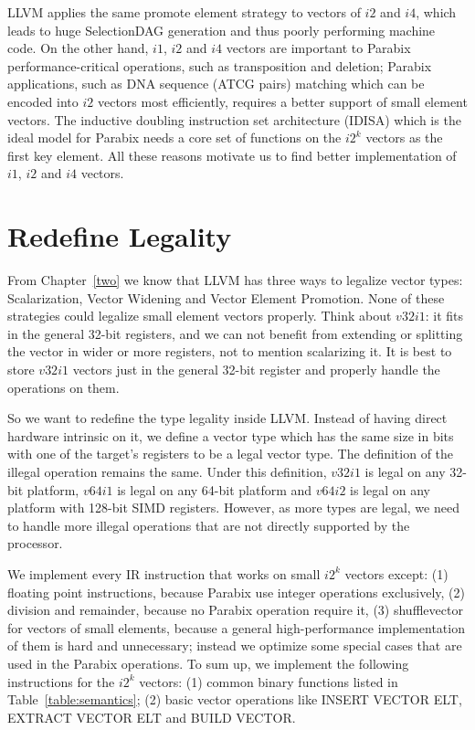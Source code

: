 LLVM applies the same promote element strategy to vectors of $i2$ and $i4$, which leads to huge SelectionDAG generation and thus poorly performing machine code. On the other hand, $i1$, $i2$ and $i4$ vectors are important to Parabix performance-critical operations, such as transposition and deletion; Parabix applications, such as DNA sequence (ATCG pairs) matching which can be encoded into $i2$ vectors most efficiently, requires a better support of small element vectors. The inductive doubling instruction set architecture (IDISA) which is the ideal model for Parabix needs a core set of functions on the $i2^k$ vectors as the first key element. All these reasons motivate us to find better implementation of $i1$, $i2$ and $i4$ vectors.

\section{Redefine Legality}

From Chapter~\ref{two} we know that LLVM has three ways to legalize vector types: Scalarization, Vector Widening and Vector Element Promotion. None of these strategies could legalize small element vectors properly. Think about $v32i1$: it fits in the general 32-bit registers, and we can not benefit from extending or splitting the vector in wider or more registers, not to mention scalarizing it. It is best to store $v32i1$ vectors just in the general 32-bit register and properly handle the operations on them.

So we want to redefine the type legality inside LLVM\@. Instead of having direct hardware intrinsic on it, we define a vector type which has the same size in bits with one of the target's registers to be a legal vector type. The definition of the illegal operation remains the same. Under this definition, $v32i1$ is legal on any 32-bit platform, $v64i1$ is legal on any 64-bit platform and $v64i2$ is legal on any platform with 128-bit SIMD registers. However, as more types are legal, we need to handle more illegal operations that are not directly supported by the processor.

We implement every IR instruction that works on small $i2^k$ vectors except: (1) floating point instructions, because Parabix use integer operations exclusively, (2) division and remainder, because no Parabix operation require it, (3) shufflevector for vectors of small elements, because a general high-performance implementation of them is hard and unnecessary; instead we optimize some special cases that are used in the Parabix operations. To sum up, we implement the following instructions for the $i2^k$ vectors: (1) common binary functions listed in Table~\ref{table:semantics}; (2) basic vector operations like INSERT VECTOR ELT, EXTRACT VECTOR ELT and BUILD VECTOR\@.

